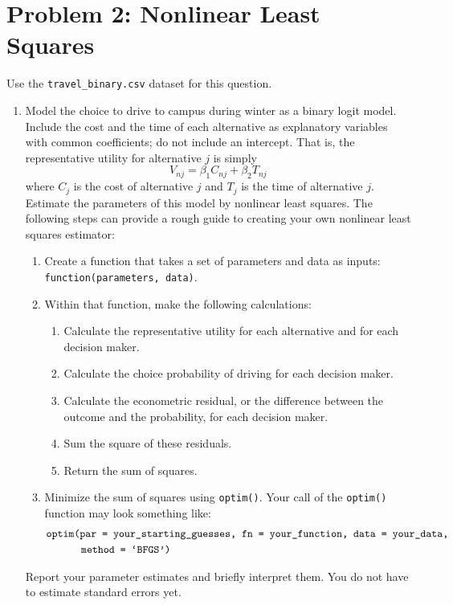 \documentclass[11pt,letterpaper]{article}
\begin{document}
\section*{Problem 2: Nonlinear Least Squares}

Use the \texttt{travel\_binary.csv} dataset for this question.

\begin{enumerate}[label=\alph*., leftmargin=*]
	\item Model the choice to drive to campus during winter as a binary logit model. Include the cost and the time of each alternative as explanatory variables with common coefficients; do not include an intercept. That is, the representative utility for alternative $j$ is simply
	$$V_{nj} = \beta_1 C_{nj} + \beta_2 T_{nj}$$
	where $C_j$ is the cost of alternative $j$ and $T_j$ is the time of alternative $j$. Estimate the parameters of this model by nonlinear least squares. The following steps can provide a rough guide to creating your own nonlinear least squares estimator:
	\begin{enumerate}[label=\Roman*.]
		\item Create a function that takes a set of parameters and data as inputs: \texttt{function(parameters, data)}.
		\item Within that function, make the following calculations:
		\begin{enumerate}[label=\roman*.]
			\item Calculate the representative utility for each alternative and for each decision maker.
			\item Calculate the choice probability of driving for each decision maker.
			\item Calculate the econometric residual, or the difference between the outcome and the probability, for each decision maker.
			\item Sum the square of these residuals.
			\item Return the sum of squares.
		\end{enumerate}
		\item Minimize the sum of squares using \texttt{optim()}. Your call of the \texttt{optim()} function may look something like:
		\begin{align*}
			&\text{\texttt{optim(par = your\_starting\_guesses, fn = your\_function, data = your\_data,}} \\
			& \qquad \quad \; \text{\texttt{method = `BFGS')}}
		\end{align*}
	\end{enumerate}
	Report your parameter estimates and briefly interpret them. You do not have to estimate standard errors yet.


\end{enumerate}
\end{document}

